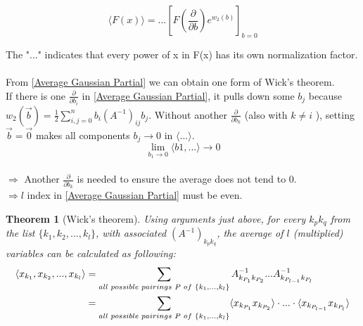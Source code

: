 \documentclass[12pt, english, a4paper]{book}
\newtheorem{theorem}{Theorem}[section]
\begin{document}
$$ \langle F(x) \rangle = ... \left[ F \left( \frac{\partial}{\partial b} \right) e^{w_2(b)} \right]_{b=0} $$

The "..." indicates that every power of x in F(x) has its own normalization factor. \\ \\

From \eqref{Average Gaussian Partial} we can obtain one form of Wick's theorem.\\
If there is one $ \frac{\partial}{\partial b_i} $ in \eqref{Average Gaussian Partial}, it pulls down some $b_j$ because $ w_2(\vec{b}) = \frac{1}{2} \sum\limits_{i,j=0}^{n} b_i (A^{-1})_{ij} b_j $. Without another $ \frac{\partial}{\partial b_k} $ (also with $ k \neq i$ ), setting $ \vec{b} = \vec{0} $ makes all components $ b_j \to 0 $ in $ \langle ... \rangle $. \\

$$\lim_{b_1 \to 0}  \langle b1, ... \rangle \to 0 $$ \\

$\Rightarrow$ Another $ \frac{\partial}{\partial b_k} $ is needed to ensure the average does not tend to 0. \\
$ \Rightarrow l $ index in \eqref{Average Gaussian Partial} must be even.

\begin{theorem}[Wick's theorem]\label{Wick's theorem}
Using arguments just above, for every $ k_p k_q $ from the list $ \lbrace k_1, k_2, ... , k_l \rbrace $, with associated $ (A^{-1})_{k_p k_q} $, the average of $l$ (multiplied) variables  can be calculated as following: \\

\begin{align*}
\left\langle x_{k_1}, x_{k_2}, ... , x_{k_l} \right\rangle & = \sum\limits_{all \hspace{1mm} possible \hspace{1mm} pairings \hspace{1mm} P \hspace{1mm} of \hspace{1mm} \lbrace k_1, ... , k_l \rbrace } A^{-1}_{k_{P_1} k_{P_2}} ... A^{-1}_{k_{P_{l-1}} k_{P_l}} \\
& = \sum\limits_{all \hspace{1mm} possible \hspace{1mm} pairings \hspace{1mm} P \hspace{1mm} of \hspace{1mm} \lbrace k_1, ... , k_l \rbrace } \langle x_{k_{P_1}} x_{k_{P_2}} \rangle \cdot ... \cdot \langle x_{k_{P_{l-1}}} x_{k_{P_l}} \rangle
\end{align*}

\end{theorem}
\end{document}
